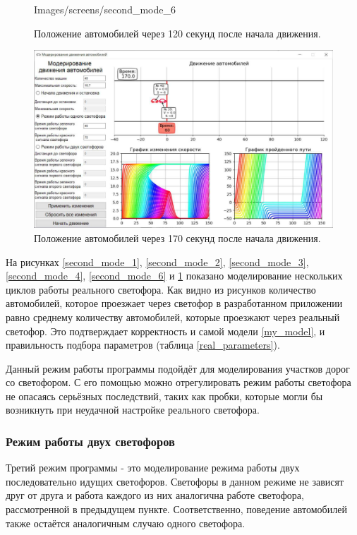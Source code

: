 \documentclass[12pt, a4paper]{extarticle}
\numberwithin{equation}{section}
\numberwithin{figure}{section}
\begin{document}
\begin{figure}[h!]
\begin{center}
\begin{minipage}[h]{0.48\linewidth}
			{Images/screens/second_mode_6}
			\caption{Положение автомобилей через 120 секунд после начала движения.}
			\label{second_mode_6}
		\end{minipage}
		\hfill
		\begin{minipage}[h]{0.48\linewidth}
			\includegraphics[width=1\linewidth]
			{Images/screens/second_mode_9}
			\caption{Положение автомобилей через 170 секунд после начала движения.} 
			\label{second_mode_9}
		\end{minipage}
	\end{center}
\end{figure}

На рисунках \ref{second_mode_1}, \ref{second_mode_2}, \ref{second_mode_3}, \ref{second_mode_4}, \ref{second_mode_6} и \ref{second_mode_9} показано моделирование нескольких циклов работы реального светофора. Как видно из рисунков количество автомобилей, которое проезжает через светофор в разработанном приложении равно среднему количеству автомобилей, которые проезжают через реальный светофор. Это подтверждает корректность и самой модели \eqref{my_model}, и правильность подбора параметров (таблица \ref{real_parameters}). 

Данный режим работы программы подойдёт для моделирования участков дорог со светофором. С его помощью можно отрегулировать режим работы светофора не опасаясь серьёзных последствий, таких как пробки, которые могли бы возникнуть при неудачной настройке реального светофора.  

\subsubsection{Режим работы двух светофоров}

Третий режим программы - это моделирование режима работы двух последовательно идущих светофоров. Светофоры в данном режиме не зависят друг от друга и работа каждого из них аналогична работе светофора, рассмотренной в предыдущем пункте. Соответственно, поведение автомобилей также остаётся аналогичным случаю одного светофора.
\end{document}
